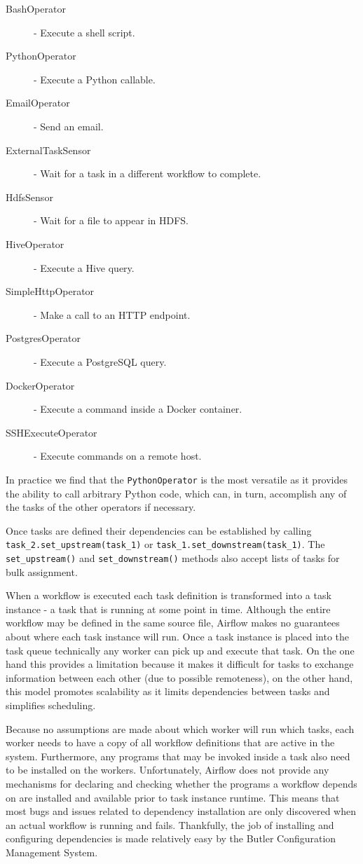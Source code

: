 \begin{description}
\item [BashOperator] - Execute a shell script.
\item [PythonOperator] - Execute a Python callable.
\item [EmailOperator] - Send an email.
\item [ExternalTaskSensor] - Wait for a task in a different workflow to complete.
\item [HdfsSensor] - Wait for a file to appear in HDFS.
\item [HiveOperator] - Execute a Hive query.
\item [SimpleHttpOperator] - Make a call to an HTTP endpoint.
\item [PostgresOperator] - Execute a PostgreSQL query.
\item [DockerOperator] - Execute a command inside a Docker container.
\item [SSHExecuteOperator] - Execute commands on a remote host.
\end{description}

In practice we find that the \texttt{PythonOperator} is the most versatile as it provides the ability to call arbitrary Python code, which can, in turn, accomplish any of the tasks of the other operators if necessary.

Once tasks are defined their dependencies can be established by calling \texttt{task_2.set_upstream(task_1)} or \texttt{task_1.set_downstream(task_1)}. The \texttt{set_upstream()} and \texttt{set_downstream()} methods also accept lists of tasks for bulk assignment.

When a workflow is executed each task definition is transformed into a task instance - a task that is running at some point in time. Although the entire workflow may be defined in the same source file, Airflow makes no guarantees about where each task instance will run. Once a task instance is placed into the task queue technically any worker can pick up and execute that task. On the one hand this provides a limitation because it makes it difficult for tasks to exchange information between each other (due to possible remoteness), on the other hand, this model promotes scalability as it limits dependencies between tasks and simplifies scheduling.

Because no assumptions are made about which worker will run which tasks, each worker needs to have a copy of all workflow definitions that are active in the system. Furthermore, any programs that may be invoked inside a task also need to be installed on the workers. Unfortunately, Airflow does not provide any mechanisms for declaring and checking whether the programs a workflow depends on are installed and available prior to task instance runtime. This means that most bugs and issues related to dependency installation are only discovered when an actual workflow is running and fails. Thankfully, the job of installing and configuring dependencies is made relatively easy by the Butler Configuration Management System. 

